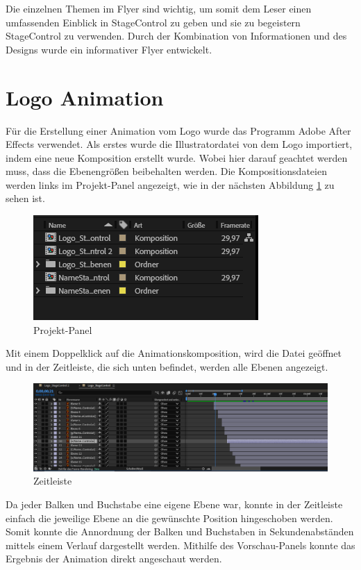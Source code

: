 Die einzelnen Themen im Flyer sind wichtig, um somit dem Leser einen umfassenden Einblick in StageControl zu geben und sie zu begeistern StageControl zu verwenden. Durch der Kombination von Informationen und des Designs wurde ein informativer Flyer entwickelt. 

\section{Logo Animation}
Für die Erstellung einer Animation vom Logo wurde das Programm Adobe After Effects verwendet. Als erstes wurde die Illustratordatei von dem Logo importiert, indem eine neue Komposition erstellt wurde. Wobei hier darauf geachtet werden muss, dass die Ebenengrößen beibehalten werden. Die Kompositionsdateien werden links im Projekt-Panel angezeigt, wie in der nächsten Abbildung \ref{fig:Projekt-Panel} zu sehen ist.

\begin{figure}[H]
	\centering
	\includegraphics[width=0.5\linewidth]{images/Projekt-Panel.png}
	\caption[Projekt-Panel]{Projekt-Panel}
	\label{fig:Projekt-Panel}
\end{figure} 

Mit einem Doppelklick auf die Animationskomposition, wird die Datei geöffnet und in der Zeitleiste, die sich unten befindet, werden alle Ebenen angezeigt. 

\begin{figure}[H]
	\centering
	\includegraphics[width=0.5\linewidth]{images/Zeitleiste.png}
	\caption[Zeitleiste]{Zeitleiste}
	\label{fig:Zeitleiste}
\end{figure} 

Da jeder Balken und Buchstabe eine eigene Ebene war, konnte in der Zeitleiste einfach die jeweilige Ebene an die gewünschte Position hingeschoben werden. Somit konnte die Annordnung der Balken und Buchstaben in Sekundenabständen mittels einem Verlauf dargestellt werden. Mithilfe des Vorschau-Panels konnte das Ergebnis der Animation direkt angeschaut werden. 

